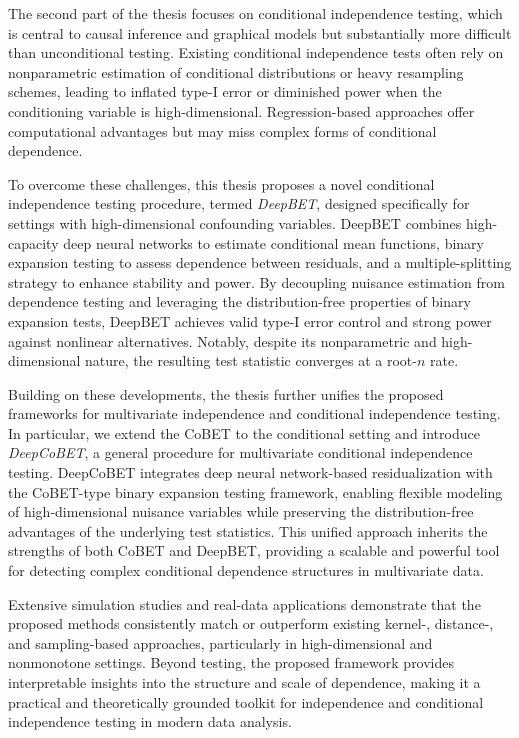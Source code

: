 \documentclass[12pt,reqno,oneside]{amsbook}
\theoremstyle{definition}
\theoremstyle{remark}
\begin{document}
The second part of the thesis focuses on conditional independence testing, which is central to causal inference and graphical models but substantially more difficult than unconditional testing. Existing conditional independence tests often rely on nonparametric estimation of conditional distributions or heavy resampling schemes, leading to inflated type-I error or diminished power when the conditioning variable is high-dimensional. Regression-based approaches offer computational advantages but may miss complex forms of conditional dependence.

To overcome these challenges, this thesis proposes a novel conditional independence testing procedure, termed \emph{DeepBET}, designed specifically for settings with high-dimensional confounding variables. DeepBET combines high-capacity deep neural networks to estimate conditional mean functions, binary expansion testing to assess dependence between residuals, and a multiple-splitting strategy to enhance stability and power. By decoupling nuisance estimation from dependence testing and leveraging the distribution-free properties of binary expansion tests, DeepBET achieves valid type-I error control and strong power against nonlinear alternatives. Notably, despite its nonparametric and high-dimensional nature, the resulting test statistic converges at a root-$n$ rate.

Building on these developments, the thesis further unifies the proposed frameworks for multivariate independence and conditional independence testing. In particular, we extend the CoBET to the conditional setting and introduce \emph{DeepCoBET}, a general procedure for multivariate conditional independence testing. DeepCoBET integrates deep neural network-based residualization with the CoBET-type binary expansion testing framework, enabling flexible modeling of high-dimensional nuisance variables while preserving the distribution-free advantages of the underlying test statistics. This unified approach inherits the strengths of both CoBET and DeepBET, providing a scalable and powerful tool for detecting complex conditional dependence structures in multivariate data.

Extensive simulation studies and real-data applications demonstrate that the proposed methods consistently match or outperform existing kernel-, distance-, and sampling-based approaches, particularly in high-dimensional and nonmonotone settings. Beyond testing, the proposed framework provides interpretable insights into the structure and scale of dependence, making it a practical and theoretically grounded toolkit for independence and conditional independence testing in modern data analysis.
\end{document}
